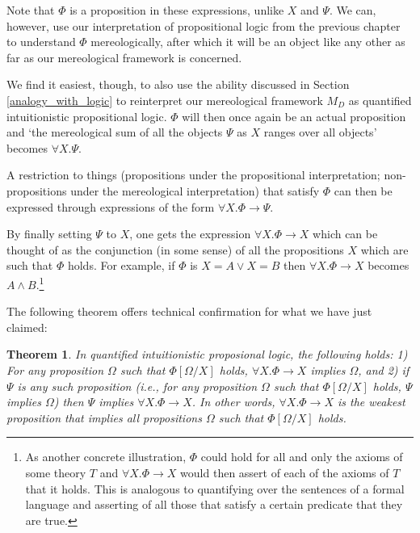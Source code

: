 \documentclass[12pt]{book}
\begin{document}
Note that $\Phi$ is a proposition in these expressions, unlike $X$ and $\Psi$. We can, however, use our interpretation of propositional logic from the previous chapter to understand $\Phi$ mereologically, after which it will be an object like any other as far as our mereological framework is concerned.

We find it easiest, though, to also use the ability discussed in Section \ref{analogy_with_logic} to reinterpret our mereological framework $M_D$ as quantified intuitionistic propositional logic. $\Phi$ will then once again be an actual proposition and `the mereological sum of all the objects $\Psi$ as $X$ ranges over all objects’ becomes $\forall X.\Psi$.

A restriction to things (propositions under the propositional interpretation; non-propositions under the mereological interpretation) that satisfy $\Phi$ can then be expressed through expressions of the form $\forall X.\Phi \rightarrow \Psi$.

By finally setting $\Psi$ to $X$, one gets the expression $\forall X.\Phi \rightarrow X$ which can be thought of as the conjunction (in some sense) of all the propositions $X$ which are such that $\Phi$ holds. For example, if $\Phi$ is $X = A \vee X = B$ then $\forall X.\Phi \rightarrow X$ becomes $A \wedge B$.\footnote{As another concrete illustration, $\Phi$ could hold for all and only the axioms of some theory $T$ and $\forall X.\Phi \rightarrow X$ would then assert of each of the axioms of $T$ that it holds. This is analogous to quantifying over the sentences of a formal language and asserting of all those that satisfy a certain predicate that they are true.}

The following theorem offers technical confirmation for what we have just claimed:
\newtheorem{theorem}{Theorem}
\begin{theorem}
\label{thm:inf-imp}
In quantified intuitionistic proposional logic, the following holds:
1) For any proposition $\Omega$ such that $\Phi[\Omega/X]$ holds, $\forall X. \Phi \to X$ implies $\Omega$, and 2) if $\Psi$ is any such proposition (i.e., for any proposition $\Omega$ such that $\Phi[\Omega/X]$ holds, $\Psi$ implies $\Omega$) then $\Psi$ implies $\forall X. \Phi \to X$. In other words, $\forall X. \Phi \to X$ is the weakest proposition that implies all propositions $\Omega$ such that $\Phi[\Omega/X]$ holds.
\end{theorem}
\end{document}
